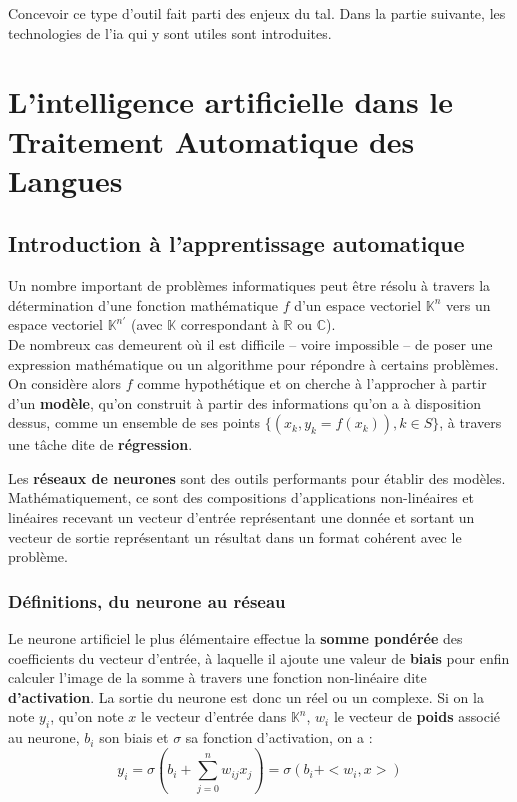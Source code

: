 \documentclass[12pt, twoside]{report}
\begin{document}
Concevoir ce type d'outil fait parti des enjeux du \Gls{tal}. Dans la partie suivante, les technologies de l'\Gls{ia} qui y sont utiles sont introduites.

\section{L'intelligence artificielle dans le Traitement Automatique des Langues}
\subsection{Introduction à l'apprentissage automatique}

Un nombre important de problèmes informatiques peut être résolu à travers la détermination d'une fonction mathématique $f$ d'un espace vectoriel $\mathbb{K}^n$ vers un espace vectoriel $\mathbb{K}^{n'}$ (avec $\mathbb{K}$ correspondant à $\mathbb{R}$ ou $\mathbb{C}$).\\
De nombreux cas demeurent où il est difficile -- voire impossible -- de poser une expression mathématique ou un algorithme pour répondre à certains problèmes. On considère alors $f$ comme hypothétique et on cherche à l'approcher à partir d'un \textbf{modèle}, qu'on construit à partir des informations qu'on a à disposition dessus, comme un ensemble de ses points $\{(x_k, y_k=f(x_k)), k \in S\}$, à travers une tâche dite de \textbf{régression}.

\vspace{12pt}
Les \textbf{réseaux de neurones} sont des outils performants pour établir des modèles. Mathématiquement, ce sont des compositions d'applications non-linéaires et linéaires recevant un vecteur d'entrée représentant une donnée et sortant un vecteur de sortie représentant un résultat dans un format cohérent avec le problème.

\subsubsection{Définitions, du neurone au réseau}
Le neurone artificiel le plus élémentaire effectue la \textbf{somme pondérée} des coefficients du vecteur d'entrée, à laquelle il ajoute une valeur de \textbf{biais} pour enfin calculer l'image de la somme à travers une fonction non-linéaire dite \textbf{d'activation}. La sortie du neurone est donc un réel ou un complexe. Si on la note $y_i$, qu'on note $x$ le vecteur d'entrée dans $\mathbb{K}^n$, $w_i$ le vecteur de \textbf{poids} associé au neurone, $b_i$ son biais et $\sigma$ sa fonction d'activation, on a :
\begin{equation}
    y_i = \sigma(b_i + \sum_{j=0}^{n} w_{ij}x_j) = \sigma(b_i + <w_i, x>)
\end{equation}\autocite[chap. ~7, section 1]{jurafsky}
\end{document}
